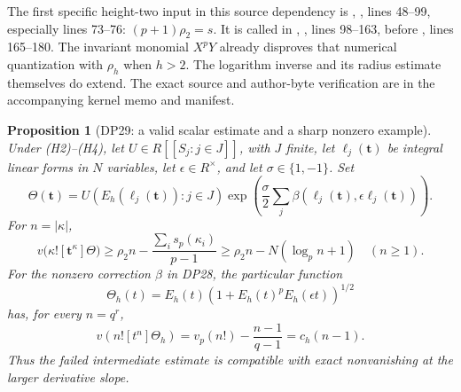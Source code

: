 \documentclass[11pt,a4paper]{article}
\newtheorem{proposition}[theorem]{Proposition}
\theoremstyle{definition}\newtheorem{remark}[theorem]{Remark}
\begin{document}
The first specific height-two input in this source dependency is , , lines 48--99, especially lines 73--76: $(p+1)\rho_2=s$. It is called in , , lines 98--163, before , lines 165--180. The invariant monomial $X^pY$ already disproves that numerical quantization with $\rho_h$ when $h>2$. The logarithm inverse and its radius estimate themselves do extend. The exact source and author-byte verification are in the accompanying kernel memo and manifest.

\begin{proposition}[DP29: a valid scalar estimate and a sharp nonzero example]\label{DP29}
Under (H2)--(H4), let $U\in R[[S_j:j\in J]]$, with $J$ finite, let $\ell_j(\mathbf t)$ be integral linear forms in $N$ variables, let $\epsilon\in R^\times$, and let $\sigma\in\{1,-1\}$. Set
\[
 \Theta(\mathbf t)=U(E_h(\ell_j(\mathbf t)):j\in J)
 \exp\left(\frac\sigma2\sum_j\beta(\ell_j(\mathbf t),\epsilon\ell_j(\mathbf t))\right).
\]
For $n=|\kappa|$,
\begin{equation}\label{eq:scalar-old-residual}
 v\bigl(\kappa![\mathbf t^\kappa]\Theta\bigr)
 \ge \rho_2n-\frac{\sum_i s_p(\kappa_i)}{p-1}
 \ge\rho_2n-N(\log_p n+1)\quad(n\ge1).
\end{equation}
For the nonzero correction $\beta$ in DP28, the particular function
\[
 \Theta_h(t)=E_h(t)\left(1+E_h(t)^pE_h(\epsilon t)\right)^{1/2}
\]
has, for every $n=q^r$,
\begin{equation}\label{eq:sharp-corrected-scalar}
 v(n![t^n]\Theta_h)=v_p(n!)-\frac{n-1}{q-1}=c_h(n-1).
\end{equation}
Thus the failed intermediate estimate is compatible with exact nonvanishing at the larger derivative slope.
\end{proposition}
\end{document}
